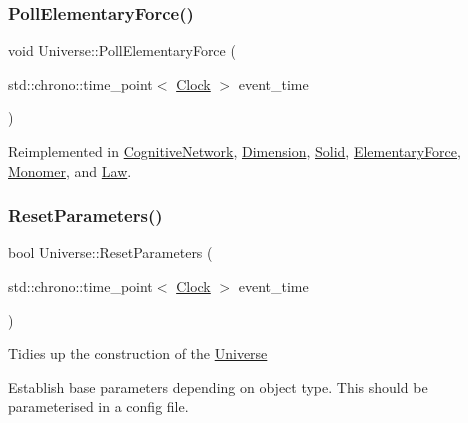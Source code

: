 \subsubsection{\texorpdfstring{Poll\+Elementary\+Force()}{PollElementaryForce()}}
{\footnotesize\ttfamily void Universe\+::\+Poll\+Elementary\+Force (\begin{DoxyParamCaption}\item[{std\+::chrono\+::time\+\_\+point$<$ \mbox{\hyperlink{universe_8h_a0ef8d951d1ca5ab3cfaf7ab4c7a6fd80}{Clock}} $>$}]{event\+\_\+time }\end{DoxyParamCaption})\hspace{0.3cm}{\ttfamily [virtual]}}



Reimplemented in \mbox{\hyperlink{classCognitiveNetwork_ac97c08a0af7dc0d02fbe059827b6be87}{Cognitive\+Network}}, \mbox{\hyperlink{classDimension_a5b07f5c8558233c8f3488baf1fe3459a}{Dimension}}, \mbox{\hyperlink{classSolid_ae2a486e59f11f96a1a39756b3f3da53f}{Solid}}, \mbox{\hyperlink{classElementaryForce_aa5ab479744dbf3e8578f8d2974299ff7}{Elementary\+Force}}, \mbox{\hyperlink{classMonomer_a5b2375df1e19abdf6045c475d2ac23ca}{Monomer}}, and \mbox{\hyperlink{classLaw_af99520c95b2cd8af0af110b78b2288ef}{Law}}.

\mbox{\label{classUniverse_a1d92b2277564577571c802f6e0c206dd}} 
\subsubsection{\texorpdfstring{Reset\+Parameters()}{ResetParameters()}}
{\footnotesize\ttfamily bool Universe\+::\+Reset\+Parameters (\begin{DoxyParamCaption}\item[{std\+::chrono\+::time\+\_\+point$<$ \mbox{\hyperlink{universe_8h_a0ef8d951d1ca5ab3cfaf7ab4c7a6fd80}{Clock}} $>$}]{event\+\_\+time }\end{DoxyParamCaption})}

Tidies up the construction of the \mbox{\hyperlink{classUniverse}{Universe}}

Establish base parameters depending on object type. This should be parameterised in a config file.\mbox{\label{classUniverse_aeda74e3902c0e56c0c09779854045cde}} 
